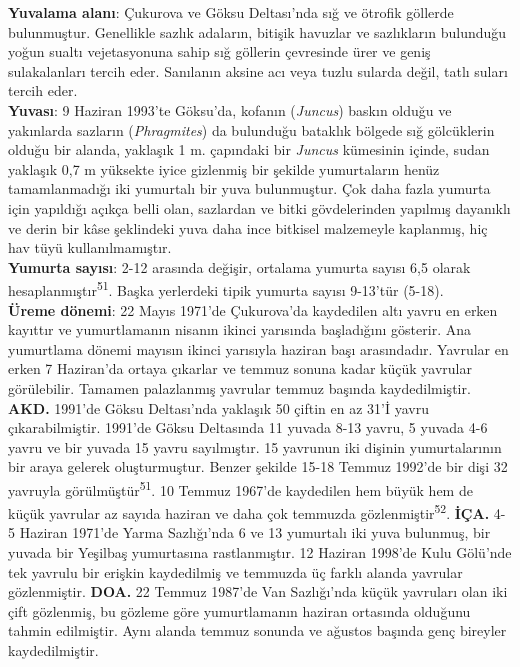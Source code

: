 \documentclass[
  letterpaper,
  DIV=11,
  numbers=noendperiod]{scrreprt}
\begin{document}
\textbf{Yuvalama alanı}: Çukurova ve Göksu Deltası'nda sığ ve ötrofik
göllerde bulunmuştur. Genellikle sazlık adaların, bitişik havuzlar ve
sazlıkların bulunduğu yoğun sualtı vejetasyonuna sahip sığ göllerin
çevresinde ürer ve geniş sulakalanları tercih eder. Sanılanın aksine acı
veya tuzlu sularda değil, tatlı suları tercih eder.\\
\textbf{Yuvası}: 9 Haziran 1993'te Göksu'da, kofanın (\emph{Juncus})
baskın olduğu ve yakınlarda sazların (\emph{Phragmites}) da bulunduğu
bataklık bölgede sığ gölcüklerin olduğu bir alanda, yaklaşık 1 m.
çapındaki bir \emph{Juncus} kümesinin içinde, sudan yaklaşık 0,7 m
yüksekte iyice gizlenmiş bir şekilde yumurtaların henüz tamamlanmadığı
iki yumurtalı bir yuva bulunmuştur. Çok daha fazla yumurta için
yapıldığı açıkça belli olan, sazlardan ve bitki gövdelerinden yapılmış
dayanıklı ve derin bir kâse şeklindeki yuva daha ince bitkisel
malzemeyle kaplanmış, hiç hav tüyü kullanılmamıştır.\\
\textbf{Yumurta sayısı}: 2-12 arasında değişir, ortalama yumurta sayısı
6,5 olarak hesaplanmıştır\textsuperscript{51}. Başka yerlerdeki tipik
yumurta sayısı 9-13'tür (5-18).\\
\textbf{Üreme dönemi}: 22 Mayıs 1971'de Çukurova'da kaydedilen altı
yavru en erken kayıttır ve yumurtlamanın nisanın ikinci yarısında
başladığını gösterir. Ana yumurtlama dönemi mayısın ikinci yarısıyla
haziran başı arasındadır. Yavrular en erken 7 Haziran'da ortaya çıkarlar
ve temmuz sonuna kadar küçük yavrular görülebilir. Tamamen palazlanmış
yavrular temmuz başında kaydedilmiştir. \textbf{AKD.} 1991'de Göksu
Deltası'nda yaklaşık 50 çiftin en az 31'İ yavru çıkarabilmiştir. 1991'de
Göksu Deltasında 11 yuvada 8-13 yavru, 5 yuvada 4-6 yavru ve bir yuvada
15 yavru sayılmıştır. 15 yavrunun iki dişinin yumurtalarının bir araya
gelerek oluşturmuştur. Benzer şekilde 15-18 Temmuz 1992'de bir dişi 32
yavruyla görülmüştür\textsuperscript{51}. 10 Temmuz 1967'de kaydedilen
hem büyük hem de küçük yavrular az sayıda haziran ve daha çok temmuzda
gözlenmiştir\textsuperscript{52}. \textbf{İÇA.} 4-5 Haziran 1971'de
Yarma Sazlığı'nda 6 ve 13 yumurtalı iki yuva bulunmuş, bir yuvada bir
Yeşilbaş yumurtasına rastlanmıştır. 12 Haziran 1998'de Kulu Gölü'nde tek
yavrulu bir erişkin kaydedilmiş ve temmuzda üç farklı alanda yavrular
gözlenmiştir. \textbf{DOA.} 22 Temmuz 1987'de Van Sazlığı'nda küçük
yavruları olan iki çift gözlenmiş, bu gözleme göre yumurtlamanın haziran
ortasında olduğunu tahmin edilmiştir. Aynı alanda temmuz sonunda ve
ağustos başında genç bireyler kaydedilmiştir.
\end{document}
